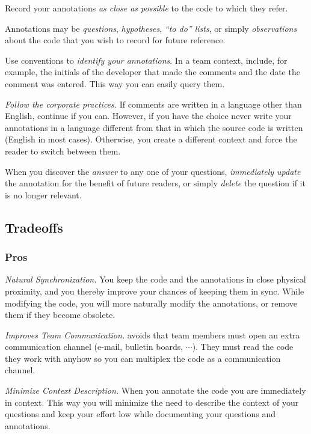 \documentclass[a4paper,10pt,twoside]{book}
\begin{document}
\begin{bulletlist}
\item Record your annotations \emph{as close as possible} to the code to which they refer.

\item Annotations may be \emph{questions}, \emph{hypotheses}, \emph{``to do'' lists}, or simply \emph{observations} about the code that you wish to record for future reference.

\item Use conventions to \emph{identify your annotations}. In a team context, include, for example, the initials of the developer that made the comments and the date the comment was entered. This way you can easily query them.

\item \emph{Follow the corporate practices.} If comments are written in a language other than English, continue if you can. However, if you have the choice never write your annotations in a language different from that in which the source code is written (English in most cases). Otherwise, you create a different context and force the reader to switch between them. 

\item When you discover the \emph{answer} to any one of your questions, \emph{immediately update} the annotation for the benefit of future readers, or simply \emph{delete} the question if it is no longer relevant.
\end{bulletlist}

\subsection*{Tradeoffs}

\subsubsection*{Pros}

\begin{bulletlist}
\item \emph{Natural Synchronization.} You keep the code and the annotations in close physical proximity, and you thereby improve your chances of keeping them in sync. While modifying the code, you will more naturally modify the annotations, or remove them if they become obsolete.

\item \emph{Improves Team Communication.}  avoids that team members must open an extra communication channel (e-mail, bulletin boards, $\cdots$). They must read the code they work with anyhow so you can multiplex the code as a communication channel.

\item \emph{Minimize Context Description.} When you annotate the code you are immediately in context. This way you will minimize the need to describe the context of your questions and keep your effort low while documenting your questions and annotations.
\end{bulletlist}
\end{document}
